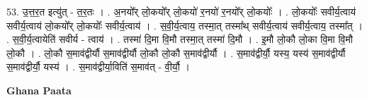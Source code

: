 \documentclass[17pt]{extarticle}
\begin{document}
53. उ॒त्त॒र॒त इत्यु॑त् - त॒र॒तः । . अ॒नयो᳚र् लो॒कयो᳚र् लो॒कयो॑ र॒नयो॑ र॒नयो᳚र् लो॒कयोः᳚ । . लो॒कयोः᳚ सवीर्य॒त्वाय॑ सवीर्य॒त्वाय॑ लो॒कयो᳚र् लो॒कयोः᳚ सवीर्य॒त्वाय॑ । . स॒वी॒र्य॒त्वाय॒ तस्मा॒त् तस्मा᳚थ् सवीर्य॒त्वाय॑ सवीर्य॒त्वाय॒ तस्मा᳚त् । . स॒वी॒र्य॒त्वायेति॑ सवीर्य - त्वाय॑ । . तस्मा॑ दि॒मा वि॒मौ तस्मा॒त् तस्मा॑ दि॒मौ । . इ॒मौ लो॒कौ लो॒का वि॒मा वि॒मौ लो॒कौ । . लो॒कौ स॒माव॑द्वीर्यौ स॒माव॑द्वीर्यौ लो॒कौ लो॒कौ स॒माव॑द्वीर्यौ । . स॒माव॑द्वीर्यौ॒ यस्य॒ यस्य॑ स॒माव॑द्वीर्यौ स॒माव॑द्वीर्यौ॒ यस्य॑ । . स॒माव॑द्वीर्या॒विति॑ स॒माव॑त् - वी॒र्यौ॒ । \newline

\textbf{Ghana Paata } \newline
\end{document}
